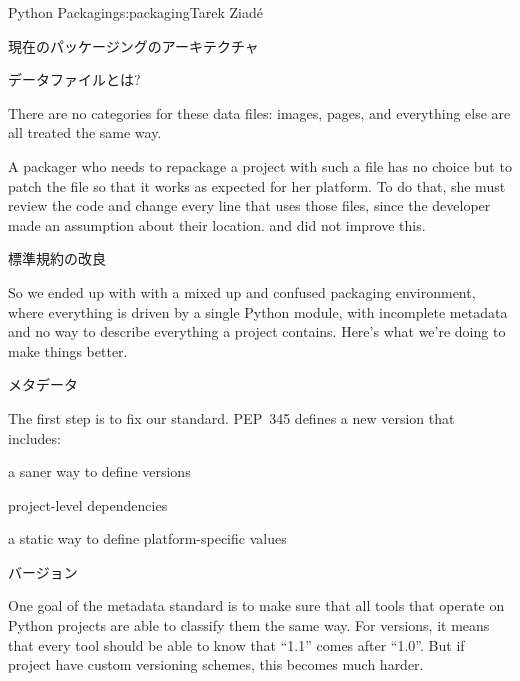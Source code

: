\begin{aosachapter}{Python Packaging}{s:packaging}{Tarek Ziad\'{e}}
\begin{aosasect1}{現在のパッケージングのアーキテクチャ}
\begin{aosasect2}{データファイルとは?}
\begin{aosaitemize}
  \item There are no categories for these data files: images, 
  pages, and everything else are all treated the same way.

\end{aosaitemize}

A packager who needs to repackage a project with such a file has no
choice but to patch the  file so that it works as
expected for her platform.  To do that, she must review the code
and change every line that uses those files, since the developer made
an assumption about their location.   and 
did not improve this.

\end{aosasect2}

\end{aosasect1}

\begin{aosasect1}{標準規約の改良}

So we ended up with with a mixed up and confused packaging
environment, where everything is driven by a single Python module,
with incomplete metadata and no way to describe everything a project
contains.  Here's what we're doing to make things better.

\begin{aosasect2}{メタデータ}

The first step is to fix our  standard.  PEP~345
defines a new version that includes:

\begin{aosaitemize}

  \item a saner way to define versions

  \item project-level dependencies

  \item a static way to define platform-specific values

\end{aosaitemize}

\begin{aosasect3}{バージョン}

One goal of the metadata standard is to make sure that all tools that
operate on Python projects are able to classify them the same
way. For versions, it means that every tool should be able to know
that ``1.1'' comes after ``1.0''. But if project have custom
versioning schemes, this becomes much harder.


\end{aosasect3}
\end{aosasect2}
\end{aosasect1}
\end{aosachapter}
